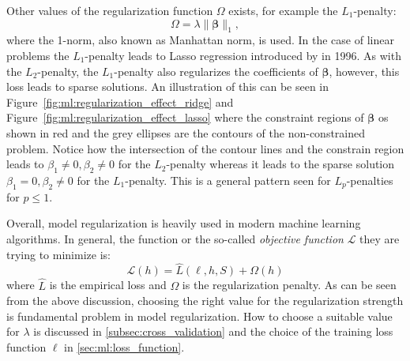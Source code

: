 \documentclass[a4paper, twoside, nobib]{tufte-book}
\newcommand{\norm}[1]{\lVert#1\rVert}
\begin{document}
Other values of the regularization function $\Omega$ exists, for example the $L_1$-penalty:
\begin{equation}
  \Omega = \lambda \norm{\bm{\beta}}_1, 
\end{equation}
where the 1-norm, also known as Manhattan norm, is used. In the case of linear problems the $L_1$-penalty leads to Lasso regression introduced by \citet{tibshiraniRegressionShrinkageSelection1996} in \num{1996}. As with the $L_2$-penalty, the $L_1$-penalty also regularizes the coefficients of $\bm{\beta}$, however, this loss leads to sparse solutions. An illustration of this can be seen in Figure~\ref{fig:ml:regularization_effect_ridge} and Figure~\ref{fig:ml:regularization_effect_lasso} where the constraint regions of $\bm{\beta}$ os shown in red and the grey ellipses are the contours of the non-constrained problem. Notice how the intersection of the contour lines and the constrain region leads to $\beta_1 \neq 0, \beta_2 \neq 0$ for the $L_2$-penalty whereas it leads to the sparse solution $\beta_1=0, \beta_2 \neq 0$ for the $L_1$-penalty. This is a general pattern seen for $L_p$-penalties for $p \leq 1$.

Overall, model regularization is heavily used in modern machine learning algorithms. In general, the function or the so-called \emph{objective function} $\mathcal{L}$ they are trying to minimize is:
\begin{equation}
  \mathcal{L}(h) = \hat{L}(\ell, h, S) + \Omega(h)
\end{equation}
where $\hat{L}$ is the empirical loss and $\Omega$ is the regularization penalty. As can be seen from the above discussion, choosing the right value for the regularization strength is fundamental problem in model regularization. How to choose a suitable value for $\lambda$ is discussed in \autoref{subsec:cross_validation} and the choice of the training loss function $\ell$ in \autoref{sec:ml:loss_function}. 
\end{document}
